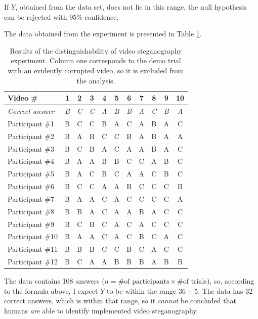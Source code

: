 \documentclass[12pt,british,twoside,notitlepage,usenames,dvipsnames,hypens,final]{report}
\numberwithin{equation}{section}
\numberwithin{figure}{section}
\begin{document}
If $Y$, obtained from the data set, does not lie in this range, the null hypothesis can be rejected with 95\% confidence.

The data obtained from the experiment is presented in Table \ref{tbl:detect-exp-res}. 

\begin{table}[tbh]
\centering
\bgroup
\def\arraystretch{1.3}%
\begin{tabular}{|l|c|c|c|c|c|c|c|c|c|c|}
\hline
\textbf{Video \#} & \textbf{1} & \textbf{2} & \textbf{3} & \textbf{4} & \textbf{5} & \textbf{6} & \textbf{7} & \textbf{8} & \textbf{9} & \textbf{10}\\
\hline
\textit{Correct answer} & \textit{B} & \textit{C} & \textit{C} & \textit{A} & \textit{B} & \textit{B} & \textit{A} & \textit{C} & \textit{B} & \textit{A}\\
\hline
Participant \#1  & B & C & C & B & A & C & A & B & A & C \\
Participant \#2  & B & A & B & C & C & B & A & B & A & A \\
Participant \#3  & B & C & B & A & C & A & A & B & A & C \\
Participant \#4  & B & A & A & B & B & C & C & A & B & C \\
Participant \#5  & B & A & C & B & C & A & A & C & B & C \\
Participant \#6  & B & C & C & A & A & B & C & C & C & B \\
Participant \#7  & B & A & A & C & A & C & C & C & C & A \\
Participant \#8  & B & B & A & C & A & A & B & A & C & C \\
Participant \#9  & B & C & B & C & A & C & A & C & C & C \\
Participant \#10 & B & A & A & C & A & C & B & C & A & C \\
Participant \#11 & B & B & B & C & C & B & C & A & C & C \\
Participant \#12 & B & C & A & A & B & B & B & A & B & B \\
\hline
\end{tabular}
\egroup
\caption{Results of the distinguishability of video steganography experiment. Column one corresponds to the demo trial with an evidently corrupted video, so it is excluded from the analysis.}
\label{tbl:detect-exp-res}
\end{table}

The data contains 108 answers ($n = \text{\# of participants} \times \text{\# of trials}$), so, according to the formula above, I expect $Y$ to be within the range $36 \pm 5$. The data has 32 correct answers, which is within that range, so it \emph{cannot} be concluded that humans \emph{are} able to identify implemented video steganography.
\end{document}
